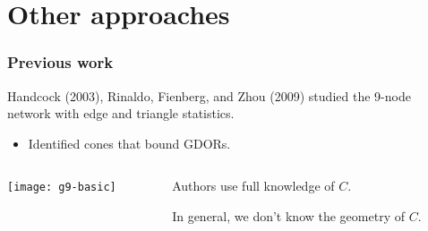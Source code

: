 \documentclass[ 10pt]{beamer}
\newcommand{\yobs}{y_{\text{obs}}}
\begin{document}
\section{Other approaches}
\frame
{
  \frametitle{Previous work}  
Handcock (2003), Rinaldo, Fienberg, and Zhou (2009) studied the 9-node network
with edge and triangle statistics.
\begin{itemize}
	\item Identified cones that bound GDORs.%
\end{itemize}

\begin{columns}[]
\begin{column}[T]{0.37\textwidth}
\texttt{[image: g9-basic]}
\end{column}

\begin{column}[t]{0.63\textwidth}
\vspace{1mm}

Authors use full knowledge of $C$.  

\vspace{1mm}

\pause
\begin{block}{}
{\alert{In general, we don't know the geometry of $C$.} }
\end{block}
\end{column}
\end{columns}


}

\end{document}
